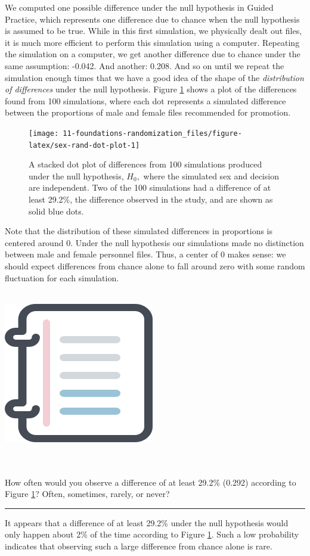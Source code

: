 \documentclass[
  10pt,
  openany]{book}
\newenvironment{mdframedwithfootGPWE}
{   
    \savenotes
    \begin{mdframed}[%
    topline=true, bottomline=true, linecolor=oiB, linewidth=0.5pt,
    rightline=false, leftline=false,
    backgroundcolor=oiLGray]
    \renewcommand{\thempfootnote}{\arabic{footnote}}
    }
{
    \end{mdframed}
    \spewnotes
}
\newenvironment{workedexample}{
    \let\oldrule\rule
    \renewcommand{\rule}[2]{\vspace{-2mm}\oldrule{##1}{##2}\vspace{-2mm}}
\vspace{4mm}
\begin{mdframedwithfootGPWE}
\begin{minipage}[t]{0.10\textwidth}
{$\:$ \\ \setkeys{Gin}{width=2.5em,keepaspectratio}\includegraphics{images/_icons/worked-example.png}}
\end{minipage}
\hfill
\begin{minipage}[t]{0.90\textwidth}
\vspace{-2mm}
\setlength{\parskip}{1em}
\noindent\textbf{\color{oiB}\small\fontfamily{phv}\selectfont{\MakeUppercase{Example}}} $\:$ \\ \\
}{\end{minipage}
\end{mdframedwithfootGPWE}
\vspace{4mm}
}
\begin{document}
We computed one possible difference under the null hypothesis in Guided Practice, which represents one difference due to chance when the null hypothesis is assumed to be true.
While in this first simulation, we physically dealt out files, it is much more efficient to perform this simulation using a computer.
Repeating the simulation on a computer, we get another difference due to chance under the same assumption: -0.042.
And another: 0.208.
And so on until we repeat the simulation enough times that we have a good idea of the shape of the \emph{distribution of differences} under the null hypothesis.
Figure \ref{fig:sex-rand-dot-plot} shows a plot of the differences found from 100 simulations, where each dot represents a simulated difference between the proportions of male and female files recommended for promotion.

\begin{figure}[h]

{\centering \texttt{[image: 11-foundations-randomization\_files/figure-latex/sex-rand-dot-plot-1]} 

}

\caption{A stacked dot plot of differences from 100 simulations produced under the null hypothesis, \(H_0,\) where the simulated sex and decision are independent. Two of the 100 simulations had a difference of at least 29.2\%, the difference observed in the study, and are shown as solid blue dots.}\label{fig:sex-rand-dot-plot}
\end{figure}



Note that the distribution of these simulated differences in proportions is centered around 0.
Under the null hypothesis our simulations made no distinction between male and female personnel files.
Thus, a center of 0 makes sense: we should expect differences from chance alone to fall around zero with some random fluctuation for each simulation.

\begin{workedexample}
How often would you observe a difference of at least 29.2\% (0.292) according to Figure \ref{fig:sex-rand-dot-plot}?
Often, sometimes, rarely, or never?

\begin{center}\rule{0.5\linewidth}{0.5pt}\end{center}

It appears that a difference of at least 29.2\% under the null hypothesis would only happen about 2\% of the time according to Figure \ref{fig:sex-rand-dot-plot}.
Such a low probability indicates that observing such a large difference from chance alone is rare.

\end{workedexample}
\end{document}
